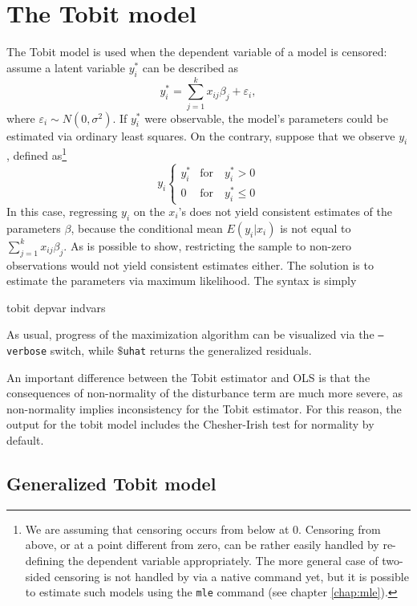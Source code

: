 \section{The Tobit model}
\label{sec:tobit}

The Tobit model is used when the dependent variable of a model is
censored: assume a latent variable $y^*_i$ can be described as
\[
  y^*_i = \sum_{j=1}^k x_{ij} \beta_j + \varepsilon_i ,
\]
where $\varepsilon_i \sim N(0,\sigma^2)$. If $y^*_i$ were observable,
the model's parameters could be estimated via ordinary least squares.
On the contrary, suppose that we observe $y_i$, defined as\footnote{We
  are assuming that censoring occurs from below at 0. Censoring from
  above, or at a point different from zero, can be rather easily
  handled by re-defining the dependent variable appropriately. The
  more general case of two-sided censoring is not handled by
   via a native command yet, but it is possible to estimate
  such models using the \texttt{mle} command (see chapter
  \ref{chap:mle}).}
\begin{equation}
  \label{eq:tobit}
  y_i \left\{ 
    \begin{array}{ll} 
      y^*_i & \mathrm{for} \quad y^*_i > 0 \\ 
      0 & \mathrm{for} \quad y^*_i \le 0 
    \end{array}
    \right. 
\end{equation}
In this case, regressing $y_i$ on the $x_i$'s does not yield
consistent estimates of the parameters $\beta$, because the
conditional mean $E(y_i|x_i)$ is not equal to $\sum_{j=1}^k x_{ij}
\beta_j$. As is possible to show, restricting the sample to non-zero
observations would not yield consistent estimates either. The solution
is to estimate the parameters via maximum likelihood. The syntax is simply
\begin{code}
  tobit depvar indvars
\end{code}

As usual, progress of the maximization algorithm can be visualized via
the \texttt{--verbose} switch, while \texttt{$\$$uhat} returns the
generalized residuals.

An important difference between the Tobit estimator and OLS is that
the consequences of non-normality of the disturbance term are much
more severe, as non-normality implies inconsistency for the Tobit
estimator. For this reason, the output for the tobit model includes
the Chesher-Irish test for normality by default.

\subsection{Generalized Tobit model}
\label{sec:heckit}

